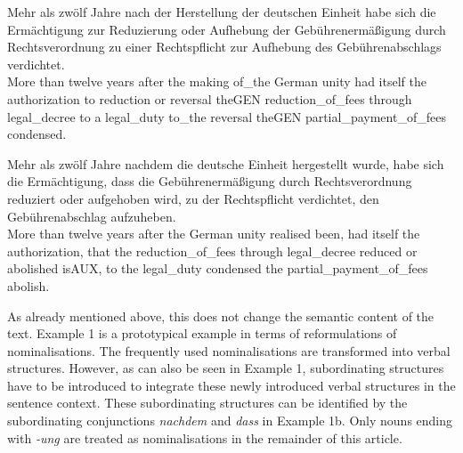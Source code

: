 \documentclass[output=paper]{langsci/langscibook}
\begin{document}
\ea
\gll Mehr als zwölf Jahre nach der Herstellung der deutschen Einheit habe sich die Ermächtigung zur Reduzierung oder Aufhebung der Gebührenermäßigung durch Rechtsverordnung zu einer Rechtspflicht zur Aufhebung des Gebührenabschlags verdichtet. \\
More than twelve years after the making of\_the German unity had itself the authorization to reduction or reversal theGEN reduction\_of\_fees through legal\_decree to a legal\_duty to\_the reversal theGEN partial\_payment\_of\_fees condensed.\\
\z

\ea
\gll Mehr als zwölf Jahre nachdem die deutsche Einheit hergestellt wurde, habe sich die Ermächtigung, dass die Gebührenermäßigung durch Rechtsverordnung reduziert oder aufgehoben wird, zu der Rechtspflicht   verdichtet, den Gebührenabschlag aufzuheben. \\
More than twelve years after the German unity   realised been, had itself the authorization, that the reduction\_of\_fees through legal\_decree reduced or abolished isAUX, to the legal\_duty condensed the partial\_payment\_of\_fees abolish.\\
\z

As already mentioned above, this does not change the semantic content of the text. Example 1 is a prototypical example in terms of reformulations of nominalisations. The frequently used nominalisations are transformed into verbal structures. However, as can also be seen in Example 1, subordinating structures have to be introduced to integrate these newly introduced verbal structures in the sentence context. These subordinating structures can be identified by the subordinating conjunctions \textit{nachdem} and \textit{dass} in Example 1b. Only nouns ending with \textit{-ung} are treated as nominalisations in the remainder of this article.
\end{document}
